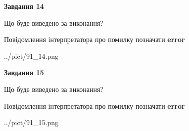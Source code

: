 \documentclass[11pt, ukrainian]{article}
\begin{document}
{\begin {large}
{\begin {center}\textbf{Завдання 14}\end {center}}\par
Що буде виведено за виконання? \par
Повідомлення інтерпретатора про помилку позначати \textbf{error}

\begin{center}
	{../pict/91_14.png}
\end{center}
\newpage

{\begin {center}\textbf{Завдання 15}\end {center}}\par
Що буде виведено за виконання? \par
Повідомлення інтерпретатора про помилку позначати \textbf{error}

\begin{center}
	{../pict/91_15.png}
\end{center}
\newpage

\end {large}}
\end{document}
